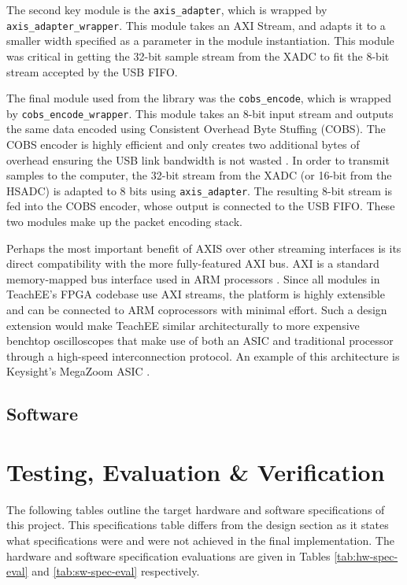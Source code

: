 \documentclass[letterpaper,11pt]{article}
\newcommand{\code}[1]{\texttt{#1}}
\begin{document}
The second key module is the \code{axis_adapter}, which is wrapped by
\code{axis_adapter_wrapper}. This module takes an AXI Stream, and adapts it to a
smaller width specified as a parameter in the module instantiation. This module
was critical in getting the 32-bit sample stream from the XADC to fit the 8-bit
stream accepted by the USB FIFO.

The final module used from the library was the \code{cobs_encode}, which is
wrapped by \code{cobs_encode_wrapper}. This module takes an 8-bit input stream
and outputs the same data encoded using Consistent Overhead Byte Stuffing
(COBS). The COBS encoder is highly efficient and only creates two additional
bytes of overhead ensuring the USB link bandwidth is not wasted \cite{cobs}.
In order to transmit samples to the computer, the 32-bit stream from the XADC
(or 16-bit from the HSADC) is adapted to 8 bits using \code{axis_adapter}. The
resulting 8-bit stream is fed into the COBS encoder, whose output is connected
to the USB FIFO. These two modules make up the packet encoding stack.

Perhaps the most important benefit of AXIS over other streaming interfaces is
its direct compatibility with the more fully-featured AXI bus. AXI is a standard
memory-mapped bus interface used in ARM processors \cite{axi_spec}. Since all
modules in TeachEE's FPGA codebase use AXI streams, the platform is highly
extensible and can be connected to ARM coprocessors with minimal effort. Such a
design extension would make TeachEE similar architecturally to more expensive
benchtop oscilloscopes that make use of both an ASIC and traditional processor
through a high-speed interconnection protocol. An example of this architecture
is Keysight's MegaZoom ASIC \cite{keysight_megazoom}.

\subsection{Software} %

\section{Testing, Evaluation \& Verification} \label{sec:testing}
The following tables outline the target hardware and software specifications of
this project. This specifications table differs from the design section as it
states what specifications were and were not achieved in the final
implementation. The hardware and software specification evaluations are given in
Tables \ref{tab:hw-spec-eval} and \ref{tab:sw-spec-eval} respectively.
\end{document}
